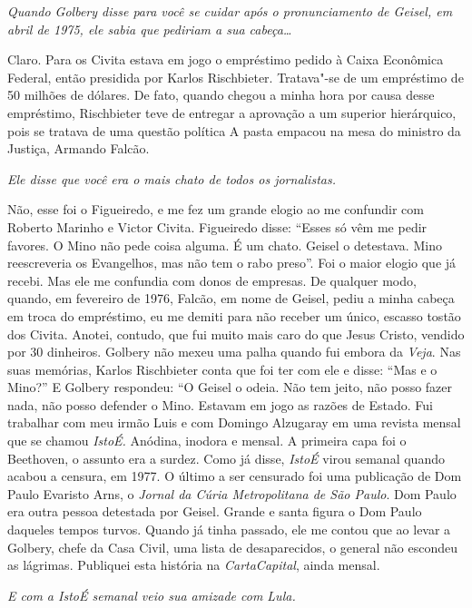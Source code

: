 \itshape
 Quando Golbery disse para você se cuidar após o
pronunciamento de Geisel, em abril de 1975, ele sabia que pediriam a sua
cabeça…

\normalfont 
Claro. Para os Civita estava em jogo o empréstimo pedido
à Caixa Econômica Federal, então presidida por Karlos Rischbieter.
Tratava"-se de um empréstimo de 50 milhões de dólares. De fato, quando
chegou a minha hora por causa desse empréstimo, Rischbieter teve de
entregar a aprovação a um superior hierárquico, pois se tratava de uma
questão política A pasta empacou na mesa do ministro da Justiça, Armando
Falcão.

\itshape
 Ele disse que você era o mais chato de todos os
jornalistas.

\normalfont 
Não, esse foi o Figueiredo, e me fez um grande elogio ao
me confundir com Roberto Marinho e Victor Civita. Figueiredo disse:
``Esses só vêm me pedir favores. O Mino não pede coisa alguma. É um
chato. Geisel o detestava. Mino reescreveria os Evangelhos, mas não tem
o rabo preso''. Foi o maior elogio que já recebi. Mas ele me confundia
com donos de empresas. De qualquer modo, quando, em fevereiro de 1976,
Falcão, em nome de Geisel, pediu a minha cabeça em troca do empréstimo,
eu me demiti para não receber um único, escasso tostão dos Civita.
Anotei, contudo, que fui muito mais caro do que Jesus Cristo, vendido
por 30 dinheiros. Golbery não mexeu uma palha quando fui embora da
\emph{Veja}. Nas suas memórias, Karlos Rischbieter conta que foi ter com
ele e disse: ``Mas e o Mino?'' E Golbery respondeu: ``O Geisel o odeia.
Não tem jeito, não posso fazer nada, não posso defender o Mino. Estavam
em jogo as razões de Estado. Fui trabalhar com meu irmão Luis e com
Domingo Alzugaray em uma revista mensal que se chamou \emph{IstoÉ.}
Anódina, inodora e mensal. A primeira capa foi o Beethoven, o assunto
era a surdez. Como já disse, \emph{IstoÉ} virou semanal quando acabou a
censura, em 1977. O último a ser censurado foi uma publicação de Dom
Paulo Evaristo Arns, o \emph{Jornal da Cúria Metropolitana de São
Paulo}. Dom Paulo era outra pessoa detestada por Geisel. Grande e santa
figura o Dom Paulo daqueles tempos turvos. Quando já tinha passado, ele
me contou que ao levar a Golbery, chefe da Casa Civil, uma lista de
desaparecidos, o general não escondeu as lágrimas. Publiquei esta
história na \emph{CartaCapital}, ainda mensal.

\itshape
 E com a \emph{IstoÉ} semanal veio sua amizade com Lula.

